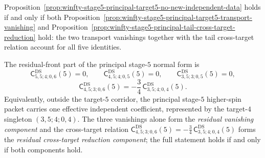 \begin{remark}
\label{rem:winfty-stage5-principal-target5-factorization}%
Proposition~\ref{prop:winfty-stage5-principal-target5-no-new-independent-data}
holds if and only if both
Proposition~\ref{prop:winfty-stage5-principal-target5-transport-vanishing}
and
Proposition~\ref{prop:winfty-stage5-principal-tail-cross-target-reduction}
hold: the two transport vanishings together with the tail cross-target relation account for all five identities.
\end{remark}

\begin{proposition}
\label{prop:winfty-stage5-principal-residual-front-one-coefficient}%
\label{prop:winfty-stage5-principal-residual-front-vanishings}%
\label{prop:winfty-stage5-principal-residual-cross-target-reduction}%
\label{prop:winfty-stage5-principal-residual-front-factorization}%
\ClaimStatusConditional{}
The residual-front part of the principal stage-$5$ normal form is
\[
\mathsf{C}^{\mathrm{DS}}_{5,5;4;0,6}(5)=0,
\qquad
\mathsf{C}^{\mathrm{DS}}_{4,5;4;0,5}(5)=0,
\qquad
\mathsf{C}^{\mathrm{DS}}_{3,5;3;0,5}(5)=0,
\]
\[
\mathsf{C}^{\mathrm{DS}}_{4,5;3;0,6}(5)
=
-\frac{3}{4}\,\mathsf{C}^{\mathrm{DS}}_{3,5;4;0,4}(5).
\]
Equivalently, outside the target-$5$ corridor, the principal stage-$5$
higher-spin packet carries one effective independent coefficient,
represented by the target-$4$ singleton \((3,5;4;0,4)\).
The three vanishings alone form the \emph{residual vanishing component}
and the cross-target relation
$\mathsf{C}^{\mathrm{DS}}_{4,5;3;0,6}(5)=-\tfrac{3}{4}\,\mathsf{C}^{\mathrm{DS}}_{3,5;4;0,4}(5)$
forms the \emph{residual cross-target reduction component};
the full statement holds if and only if both components hold.
\end{proposition}

